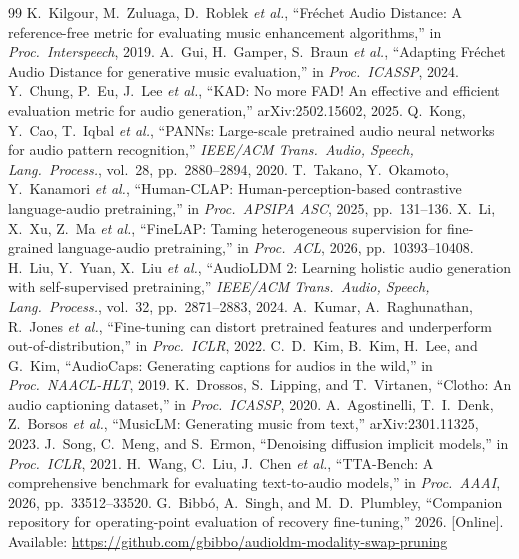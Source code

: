 {\begin{thebibliography}{99}
 K.~Kilgour, M.~Zuluaga, D.~Roblek \emph{et al.}, ``Fr\'echet Audio
Distance: A reference-free metric for evaluating music enhancement algorithms,'' in
\emph{Proc.\ Interspeech}, 2019.
 A.~Gui, H.~Gamper, S.~Braun \emph{et al.}, ``Adapting Fr\'echet Audio
Distance for generative music evaluation,'' in \emph{Proc.\ ICASSP}, 2024.
 Y.~Chung, P.~Eu, J.~Lee \emph{et al.}, ``KAD: No more FAD!
An effective and efficient evaluation metric for audio generation,'' arXiv:2502.15602, 2025.
 Q.~Kong, Y.~Cao, T.~Iqbal \emph{et al.}, ``PANNs:
Large-scale pretrained audio neural networks for audio pattern recognition,'' \emph{IEEE/ACM
Trans.\ Audio, Speech, Lang.\ Process.}, vol.~28, pp.~2880--2894, 2020.
 T.~Takano, Y.~Okamoto, Y.~Kanamori \emph{et al.}, ``Human-CLAP:
Human-perception-based contrastive language-audio pretraining,'' in \emph{Proc.\ APSIPA ASC}, 2025,
pp.~131--136.
 X.~Li, X.~Xu, Z.~Ma \emph{et al.}, ``FineLAP: Taming
heterogeneous supervision for fine-grained language-audio pretraining,'' in \emph{Proc.\ ACL}, 2026,
pp.~10393--10408.
 H.~Liu, Y.~Yuan, X.~Liu \emph{et al.}, ``AudioLDM 2: Learning holistic audio generation with self-supervised
pretraining,'' \emph{IEEE/ACM Trans.\ Audio, Speech, Lang.\ Process.}, vol.~32, pp.~2871--2883, 2024.
 A.~Kumar, A.~Raghunathan, R.~Jones \emph{et al.}, ``Fine-tuning
can distort pretrained features and underperform out-of-distribution,'' in \emph{Proc.\ ICLR}, 2022.
 C.~D.~Kim, B.~Kim, H.~Lee, and G.~Kim, ``AudioCaps: Generating captions
for audios in the wild,'' in \emph{Proc.\ NAACL-HLT}, 2019.
 K.~Drossos, S.~Lipping, and T.~Virtanen, ``Clotho: An audio captioning dataset,'' in \emph{Proc.\ ICASSP}, 2020.
 A.~Agostinelli, T.~I.~Denk, Z.~Borsos \emph{et al.}, ``MusicLM:
Generating music from text,'' arXiv:2301.11325, 2023.
 J.~Song, C.~Meng, and S.~Ermon, ``Denoising diffusion implicit models,'' in
\emph{Proc.\ ICLR}, 2021.
 H.~Wang, C.~Liu, J.~Chen \emph{et al.}, ``TTA-Bench: A comprehensive benchmark for evaluating text-to-audio models,'' in \emph{Proc.\ AAAI}, 2026, pp.~33512--33520.
 G.~Bibb\'o, A.~Singh, and M.~D.~Plumbley, ``Companion repository for operating-point evaluation of recovery fine-tuning,'' 2026. [Online]. Available: \url{https://github.com/gbibbo/audioldm-modality-swap-pruning}
\end{thebibliography}}


